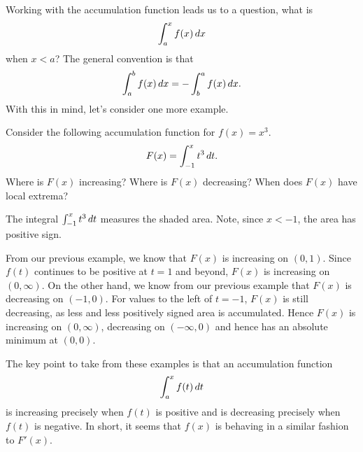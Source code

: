 \documentclass{ximera}
\begin{document}
Working with the accumulation function leads us to a question, what is  
\[
\int_a^x f(x) \,d x
\]
when $x< a$? The general convention is that 
\[
\int_a^b f(x) \,d x = -\int_b^a f(x) \,d x. 
\]
With this in mind, let's consider one more example.


\begin{example} 
Consider the following accumulation function for $f(x) = x^3$.
\[
F(x) = \int_{-1}^x t^3 \,d t.
\]
Where is $F(x)$ increasing? Where is $F(x)$ decreasing? When does
$F(x)$ have local extrema?
\end{example}

\begin{marginfigure}
\caption{The integral $\int_{-1}^x t^3 \,d t$ measures the shaded
  area. Note, since $x<-1$, the area has positive sign.}
\label{figure:accumulationegreal}
\end{marginfigure}

\begin{solution}
From our previous example, we know that $F(x)$ is increasing on
$(0,1)$. Since $f(t)$ continues to be positive at $t=1$ and beyond,
  $F(x)$ is increasing on $(0,\infty)$. On the other hand, we know
  from our previous example that $F(x)$ is decreasing on $(-1,0)$. For
  values to the left of $t=-1$, $F(x)$ is still decreasing, as less
  and less positively signed area is accumulated. Hence $F(x)$ is
  increasing on $(0,\infty)$, decreasing on $(-\infty,0)$ and hence
  has an absolute minimum at $(0,0)$.
\end{solution}

The key point to take from these examples is that an accumulation function
\[
\int_a^x f(t) \,d t
\]
is increasing precisely when $f(t)$ is positive and is decreasing
precisely when $f(t)$ is negative. In short, it seems that $f(x)$ is
behaving in a similar fashion to $F'(x)$.
\end{document}
